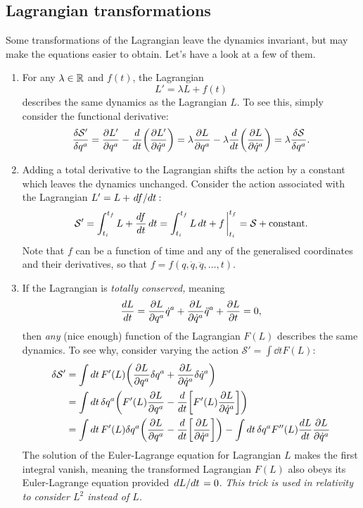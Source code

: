 \documentclass{article}
\begin{document}
\subsection{Lagrangian transformations}
Some transformations of the Lagrangian leave the dynamics invariant, but may make the equations easier to obtain. Let's have a look at a few of them.
\begin{enumerate}
    \item For any $\lambda \in \mathbb{R}$ and $f(t)$, the Lagrangian
    \[
        L' = \lambda L + f(t)
    \]
    describes the same dynamics as the Lagrangian $L$. To see this, simply consider the functional derivative:
    \[
        \fdv{\mathcal{S}'}{q^a} = \pdv{L'}{q^a} - \dv{t}\qty(\pdv{L'}{\dot{q}^a}) = \lambda \pdv{L}{q^a} - \lambda \dv{t}\qty(\pdv{L}{\dot{q}^a}) = \lambda \fdv{\mathcal{S}}{q^a}.
    \]
    \item Adding a total derivative to the Lagrangian shifts the action by a constant which leaves the dynamics unchanged. Consider the action associated with the Lagrangian $L' = L + \dv*{f}{t}$:
    \[
    \mathcal{S}' = \int_{t_i}^{t_f} L + \dv{f}{t} \dd{t} = \int_{t_i}^{t_f} L \dd{t} + f \eval_{t_i}^{t_f} = \mathcal{S} + \text{constant.}
    \]
    Note that $f$ can be a function of time and any of the generalised coordinates and their derivatives, so that $f = f(q,\dot{q}, \ddot{q}, \dots, t)$.
    \item If the Lagrangian is \textit{totally conserved,} meaning
    \[
        \dv{L}{t} = \pdv{L}{q^a} \dot{q}^a + \pdv{L}{\dot{q}^a} \ddot{q}^a + \pdv{L}{t} = 0,
    \]
    then \textit{any} (nice enough) function of the Lagrangian $F(L)$ describes the same dynamics. To see why, consider varying the action $  \mathcal{S}' = \int \dd{t} F(L) $:
  	\begin{align*}
  	\delta \mathcal{S}' &= \int \dd{t} F'(L) \qty(\pdv{L}{q^{a}} \delta q^{a} + \pdv{L}{\dot{q}^{a}} \delta \dot{q}^{a}) \\
  	&= \int \dd{t} \delta q^{a} \qty(F'(L) \pdv{L}{q^{a}} - \dv{t}\qty[F'(L) \pdv{L}{\dot{q}^{a}}]) \\
  	&= \int \dd{t} F'(L) \delta q^{a} \qty(\pdv{L}{q^{a}} - \dv{t}\qty[\pdv{L}{\dot{q}^{a}}]) - \int \dd{t} \delta q^{a} F''(L) \dv{L}{t} \pdv{L}{\dot{q}^{a}}
  	\end{align*}
    The solution of the Euler-Lagrange equation for Lagrangian $L$ makes the first integral vanish, meaning the transformed Lagrangian $F(L)$ also obeys its Euler-Lagrange equation provided $ \dv*{L}{t} = 0 $. \textit{This trick is used in relativity to consider $L^2$ instead of $L$.}
\end{enumerate}
\end{document}
